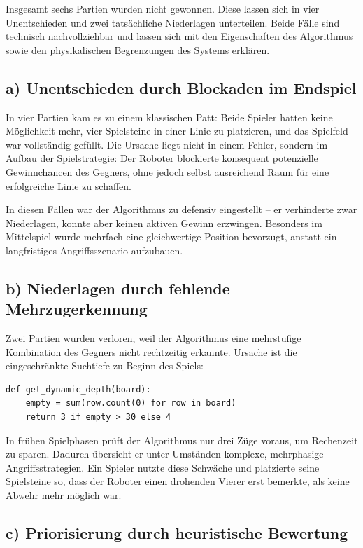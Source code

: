 Insgesamt sechs Partien wurden nicht gewonnen. Diese lassen sich in vier Unentschieden und zwei tatsächliche Niederlagen unterteilen. Beide Fälle sind technisch nachvollziehbar und lassen sich mit den Eigenschaften des Algorithmus sowie den physikalischen Begrenzungen des Systems erklären.

\subsection*{a) Unentschieden durch Blockaden im Endspiel}

In vier Partien kam es zu einem klassischen Patt: Beide Spieler hatten keine Möglichkeit mehr, vier Spielsteine in einer Linie zu platzieren, und das Spielfeld war vollständig gefüllt. Die Ursache liegt nicht in einem Fehler, sondern im Aufbau der Spielstrategie: Der Roboter blockierte konsequent potenzielle Gewinnchancen des Gegners, ohne jedoch selbst ausreichend Raum für eine erfolgreiche Linie zu schaffen.

In diesen Fällen war der Algorithmus zu defensiv eingestellt – er verhinderte zwar Niederlagen, konnte aber keinen aktiven Gewinn erzwingen. Besonders im Mittelspiel wurde mehrfach eine gleichwertige Position bevorzugt, anstatt ein langfristiges Angriffsszenario aufzubauen.

\subsection*{b) Niederlagen durch fehlende Mehrzugerkennung}

Zwei Partien wurden verloren, weil der Algorithmus eine mehrstufige Kombination des Gegners nicht rechtzeitig erkannte. Ursache ist die eingeschränkte Suchtiefe zu Beginn des Spiels:

\begin{lstlisting}[style=pythonstyle]
	def get_dynamic_depth(board):
	empty = sum(row.count(0) for row in board)
	return 3 if empty > 30 else 4
\end{lstlisting}

In frühen Spielphasen prüft der Algorithmus nur drei Züge voraus, um Rechenzeit zu sparen. Dadurch übersieht er unter Umständen komplexe, mehrphasige Angriffsstrategien. Ein Spieler nutzte diese Schwäche und platzierte seine Spielsteine so, dass der Roboter einen drohenden Vierer erst bemerkte, als keine Abwehr mehr möglich war.

\subsection*{c) Priorisierung durch heuristische Bewertung}

